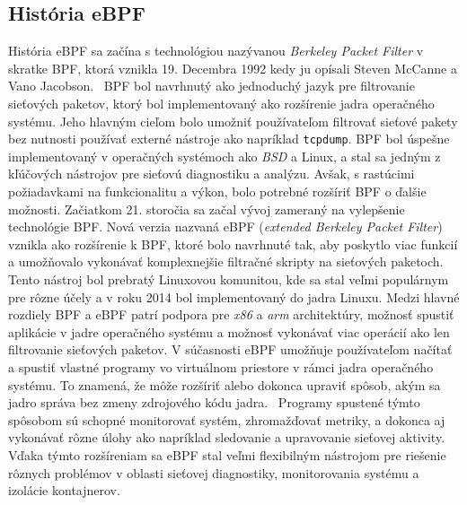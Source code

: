 \subsection{História eBPF}
História eBPF sa začína s technológiou nazývanou \emph{Berkeley Packet Filter} v skratke BPF, ktorá vznikla 19. Decembra 1992 kedy ju opísali Steven McCanne a Vano Jacobson.~\cite{bpf} 
BPF bol navrhnutý ako jednoduchý jazyk pre filtrovanie sieťových paketov, ktorý bol implementovaný ako rozšírenie jadra operačného systému. Jeho hlavným cieľom 
bolo umožniť používateľom filtrovať sieťové pakety bez nutnosti používať externé nástroje ako napríklad \texttt{tcpdump}. 
BPF bol úspešne implementovaný v operačných systémoch ako \emph{BSD} a Linux, a stal sa jedným z kľúčových nástrojov pre sieťovú diagnostiku a analýzu. 
Avšak, s rastúcimi požiadavkami na funkcionalitu a výkon, bolo potrebné rozšíriť BPF o ďalšie možnosti. Začiatkom 21. storočia sa začal vývoj zameraný na vylepšenie technológie BPF. 
Nová verzia nazvaná eBPF (\emph{extended Berkeley Packet Filter}) vznikla ako rozšírenie k BPF, ktoré bolo navrhnuté tak, aby poskytlo viac funkcií a umožňovalo vykonávať 
komplexnejšie filtračné skripty na sieťových paketoch. Tento nástroj bol prebratý Linuxovou komunitou, kde sa stal veľmi populárnym pre rôzne účely a v roku 2014 bol 
implementovaný do jadra Linuxu. Medzi hlavné rozdiely BPF a eBPF patrí podpora pre \emph{x86} a \emph{arm} architektúry, možnosť spustiť aplikácie v jadre operačného systému 
a možnosť vykonávať viac operácií ako len filtrovanie sieťových paketov. V súčasnosti eBPF umožňuje používateľom načítať a spustiť vlastné programy vo 
virtuálnom priestore v rámci jadra operačného systému. To znamená, že môže rozšíriť alebo dokonca upraviť spôsob, akým sa jadro správa 
bez zmeny zdrojového kódu jadra.~\cite{book1} Programy spustené týmto spôsobom sú schopné monitorovať systém, zhromažďovať metriky, a dokonca aj vykonávať 
rôzne úlohy ako napríklad sledovanie a upravovanie sieťovej aktivity. Vďaka týmto rozšíreniam sa eBPF stal veľmi flexibilným nástrojom pre 
riešenie rôznych problémov v oblasti sieťovej diagnostiky, monitorovania systému a izolácie kontajnerov.


